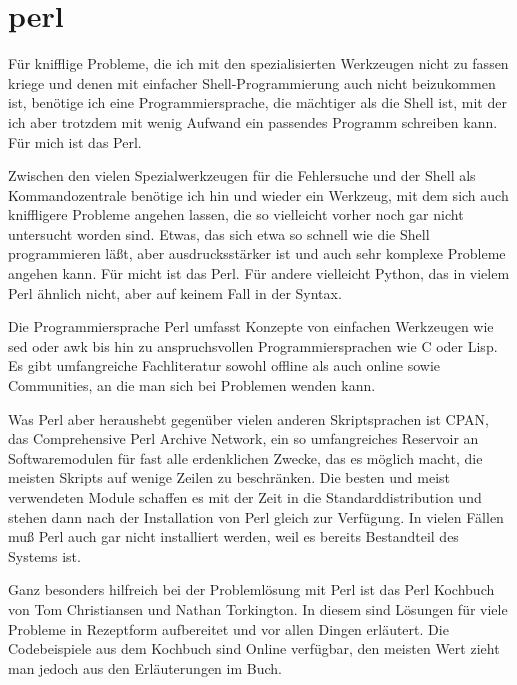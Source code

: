 \section{perl}
\label{sec:lokal-werkzeuge-perl}
\begin{abstractsec}
  Für knifflige Probleme, die ich mit den spezialisierten Werkzeugen nicht zu
  fassen kriege und denen mit einfacher Shell-Programmierung auch nicht
  beizukommen ist, benötige ich eine Programmiersprache, die mächtiger als die
  Shell ist, mit der ich aber trotzdem mit wenig Aufwand ein passendes
  Programm schreiben kann. Für mich ist das Perl.
\end{abstractsec}
\begin{normaltext}
  Zwischen den vielen Spezialwerkzeugen für die Fehlersuche und der Shell als
  Kommandozentrale benötige ich hin und wieder ein Werkzeug, mit dem sich auch
  kniffligere Probleme angehen lassen, die so vielleicht vorher noch gar nicht
  untersucht worden sind. Etwas, das sich etwa so schnell wie die Shell
  programmieren läßt, aber ausdrucksstärker ist und auch sehr komplexe
  Probleme angehen kann. Für micht ist das Perl. Für andere vielleicht Python,
  das in vielem Perl ähnlich nicht, aber auf keinem Fall in der Syntax.

  Die Programmiersprache Perl umfasst Konzepte von einfachen Werkzeugen wie sed
  oder awk bis hin zu anspruchsvollen Programmiersprachen wie C oder Lisp. Es
  gibt umfangreiche Fachliteratur sowohl offline als auch online sowie
  Communities, an die man sich bei Problemen wenden kann.

  Was Perl aber heraushebt gegenüber vielen anderen Skriptsprachen ist CPAN,
  das Comprehensive Perl Archive Network, ein so umfangreiches Reservoir an
  Softwaremodulen für fast alle erdenklichen Zwecke, das es möglich macht, die
  meisten Skripts auf wenige Zeilen zu beschränken. Die besten und meist
  verwendeten Module schaffen es mit der Zeit in die Standarddistribution und
  stehen dann nach der Installation von Perl gleich zur Verfügung. In vielen
  Fällen muß Perl auch gar nicht installiert werden, weil es bereits
  Bestandteil des Systems ist.

  Ganz besonders hilfreich bei der Problemlösung mit Perl ist das Perl
  Kochbuch von Tom Christiansen und Nathan Torkington. In diesem sind Lösungen
  für viele Probleme in Rezeptform aufbereitet und vor allen Dingen erläutert.
  Die Codebeispiele aus dem Kochbuch sind Online verfügbar, den meisten Wert
  zieht man jedoch aus den Erläuterungen im Buch.


\end{normaltext}
